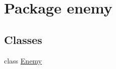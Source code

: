 \hypertarget{namespaceenemy}{}\section{Package enemy}
\label{namespaceenemy}
\subsection*{Classes}
\begin{DoxyCompactItemize}
\item 
class \hyperlink{classenemy_1_1_enemy}{Enemy}
\end{DoxyCompactItemize}
